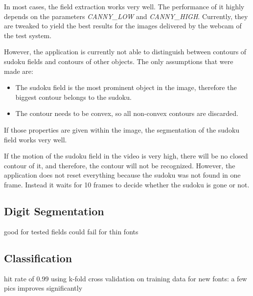 \documentclass[
a4paper,     %
12pt         %
]{scrartcl}  %
\begin{document}
In most cases, the field extraction works very well. The performance of it highly depends on the 
parameters \emph{CANNY\_LOW} and \emph{CANNY\_HIGH}. Currently, they are tweaked to yield the best
results for the images delivered by the webcam of the test system.

However, the application is currently not able to distinguish between contours of sudoku fields and
contours of other objects. The only assumptions that were made are:

\begin{itemize}
  \item The sudoku field is the most prominent object in the image, therefore the biggest contour
  belongs to the sudoku.
  \item The contour needs to be convex, so all non-convex contours are discarded.
\end{itemize}

If those properties are given within the image, the segmentation of the sudoku field works very well. 

If the motion of the sudoku field in the video is very high, there will be no closed contour of it,
and therefore, the contour will not be recognized. However, the application does not reset everything because
the sudoku was not found in one frame. Instead it waits for 10 frames to decide whether the sudoku is gone
or not.

\subsection{Digit Segmentation}

good for tested fields
could fail for thin fonts

\subsection{Classification}

hit rate of 0.99 using k-fold cross validation on training data
for new fonts: a few pics improves significantly
\end{document}
